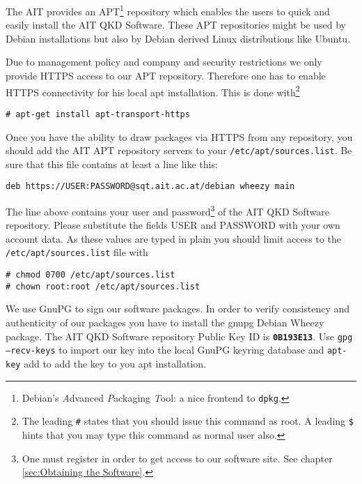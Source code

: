 The AIT provides an APT\footnote{Debian's \textit{A}dvanced \textit{P}ackaging \textit{T}ool: a nice frontend to \texttt{dpkg}.} repository which enables the users to quick and easily install the AIT QKD Software. These APT repositories might be used by Debian installations but also by Debian derived Linux distributions like Ubuntu.

\medskip

Due to management policy and company and security restrictions we only provide HTTPS access to our APT repository. Therefore one has to enable HTTPS connectivity for his local apt installation. This is done with\footnote{The leading \texttt{\#} states that you should issue this command as root. A leading \texttt{\$} hints that you may type this command as normal user also.}

\begin{minipage}{0.9\textwidth}
\bigskip
\begin{verbatim}
# apt-get install apt-transport-https
\end{verbatim}
\medskip
\end{minipage}

Once you have the ability to draw packages via HTTPS from any repository, you should add the AIT APT repository servers to your \texttt{/etc/apt/sources.list}. Be sure that this file contains at least a line like this:

\begin{minipage}{0.9\textwidth}
\bigskip
\begin{verbatim}
deb https://USER:PASSWORD@sqt.ait.ac.at/debian wheezy main
\end{verbatim}
\medskip
\end{minipage}

The line above contains your user and password\footnote{One must register in order to get access to our software site. See chapter \ref{sec:Obtaining the Software}.} of the AIT QKD Software repository. Please substitute the fields USER and PASSWORD with your own account data. As these values are typed in plain you should limit access to the \texttt{/etc/apt/sources.list} file with

\begin{minipage}{0.9\textwidth}
\bigskip
\begin{verbatim}
# chmod 0700 /etc/apt/sources.list
# chown root:root /etc/apt/sources.list
\end{verbatim}
\medskip
\end{minipage}

We use GnuPG to sign our software packages. In order to verify consistency and authenticity of our packages you have to install the gnupg Debian Wheezy package. The AIT QKD Software repository Public Key ID is \textbf{\texttt{0B193E13}}. Use \texttt{gpg --recv-keys} to import our key into the local GnuPG keyring database and \texttt{apt-key} add to add the key to you apt installation.

